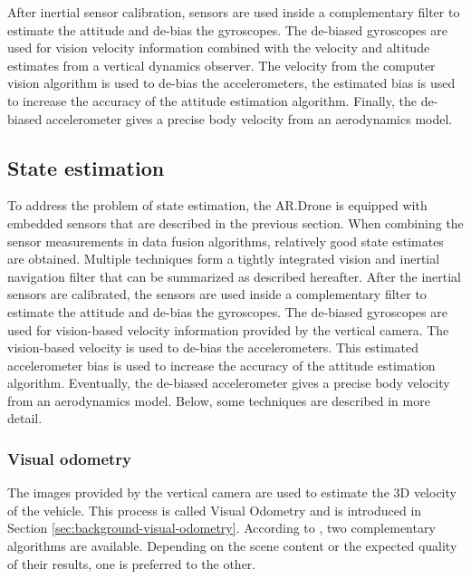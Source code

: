 After inertial sensor calibration, sensors are used inside a complementary filter to estimate the attitude and de-bias the gyroscopes.
The de-biased gyroscopes are used for vision velocity information combined with the velocity and altitude estimates from a vertical dynamics observer.
The velocity from the computer vision algorithm is used to de-bias the accelerometers, the estimated bias is used to increase the accuracy of the attitude estimation algorithm.
Finally, the de-biased accelerometer gives a precise body velocity from an aerodynamics model.


\subsection{State estimation}
To address the problem of state estimation, the AR.Drone is equipped with embedded sensors that are described in the previous section.
When combining the sensor measurements in data fusion algorithms, relatively good state estimates are obtained.
Multiple techniques form a tightly integrated vision and inertial navigation filter that can be summarized as described hereafter.
After the inertial sensors are calibrated, the sensors are used inside a complementary filter to estimate the attitude and de-bias the gyroscopes.
The de-biased gyroscopes are used for vision-based velocity information provided by the vertical camera.
The vision-based velocity is used to de-bias the accelerometers. This estimated accelerometer bias is used to increase the accuracy of the attitude estimation algorithm.
Eventually, the de-biased accelerometer gives a precise body velocity from an aerodynamics model.
Below, some techniques are described in more detail.

\subsubsection{Visual odometry}
\label{sec:platform-visual-odometry}
The images provided by the vertical camera are used to estimate the 3D velocity of the vehicle.
This process is called Visual Odometry and is introduced in Section \ref{sec:background-visual-odometry}.
According to \cite{bristeau2011navigation}, two complementary algorithms are available.
Depending on the scene content or the expected quality of their results, one is preferred to the other.

